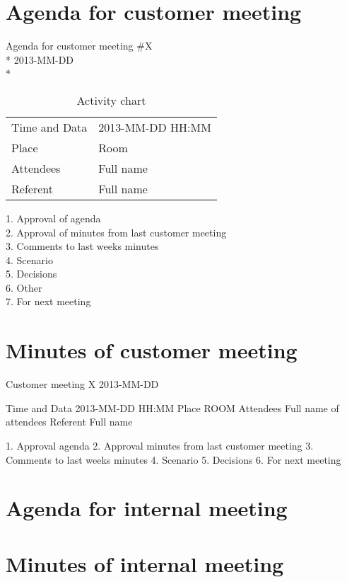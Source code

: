 \section{Agenda for customer meeting}

\begin{center}
Agenda for customer meeting \#X\\*
2013-MM-DD\\*
\end{center}

\begin{table}
\begin{center}
\begin{tabular}{ l | l }
Time and Data & 2013-MM-DD HH:MM \\
Place & Room \\
Attendees & Full name \\
Referent & Full name \\
\end{tabular}
\end{center}
\caption{Activity chart}
\label{table:activityChartCustomerAgenda}
\end{table}


1. Approval of agenda \\
2. Approval of minutes from last customer meeting \\
3. Comments to last weeks minutes \\
4. Scenario \\
5. Decisions \\
6. Other \\
7. For next meeting \\


\section{Minutes of customer meeting}

Customer meeting X 
2013-MM-DD

Time and Data 	2013-MM-DD HH:MM
Place			ROOM
Attendees  		Full name of attendees
Referent  		Full name

1. Approval agenda
2. Approval minutes from last customer meeting
3. Comments to last weeks minutes
4. Scenario
5. Decisions
6. For next meeting

\section{Agenda for internal meeting}

\section{Minutes of internal meeting}